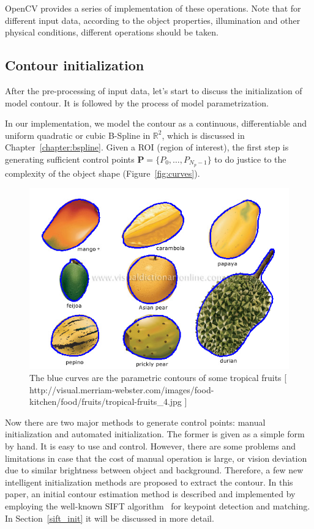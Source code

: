 OpenCV provides a series of implementation of these operations. Note
that for different input data, according to the object properties,
illumination and other physical conditions, different operations
should be taken. 

\subsection{Contour initialization}
\label{sec:mp}

After the pre-processing of input data, let's start to discuss the
initialization of model contour. It is followed by the process of
model parametrization.

In our implementation, we model the
contour as a continuous, differentiable and uniform quadratic or cubic
B-Spline in $\mathbb{R}^2$, which is discussed in Chapter~\ref{chapter:bspline}. 
Given a ROI (region of interest), the first step is generating
sufficient control points $\mathbf{P} = \{P_0, \ldots, P_{N_p-1}\}$ to
do justice to the complexity of the object shape
(Figure~\ref{fig:curves}).

\begin{figure}[htb]
  \centering
  \includegraphics[width=\linewidth]{images/curves.png}
\caption[The parametric of some tropical fruits]{The blue curves are
  the parametric contours of some tropical fruits [\\
  http://visual.merriam-webster.com/images/food-kitchen/food/fruits/tropical-fruits\_4.jpg
  ]}
\label{fig:prior}
\end{figure}

Now there are two major methods to generate control points:
manual initialization and automated initialization. The former is
given as a simple form by hand. It is easy to use and
control. However, there are some problems and limitations in case that
the cost of manual operation is large, or vision deviation due to
similar brightness between object and background. Therefore, a few new
intelligent initialization methods are proposed to extract the
contour.
In this paper, an initial contour estimation method is described and
implemented by employing the well-known SIFT algorithm~\cite{lowe2004distinctive} for
keypoint detection and matching. In Section~\ref{sift_init} it will be discussed in
more detail.


